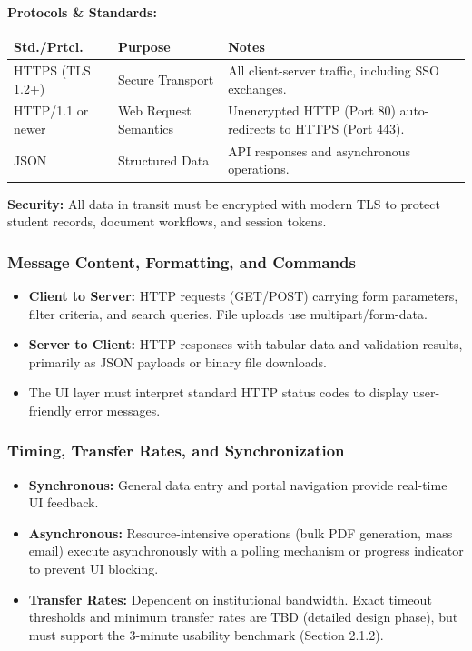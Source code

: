 \documentclass[11pt, a4paper]{article}
\begin{document}
\textbf{Protocols \& Standards:}
\begin{table}[H]
\begin{tabularx}{\textwidth}{>{\raggedright\arraybackslash}p{2.2cm} >{\raggedright\arraybackslash}p{2cm} >{\raggedright\arraybackslash}X}
\toprule
\textbf{Std./Prtcl.} & \textbf{Purpose} & \textbf{Notes} \\
\midrule
HTTPS (TLS 1.2+) & Secure Transport & All client-server traffic, including SSO exchanges. \\
\midrule
HTTP/1.1 or newer & Web Request Semantics & Unencrypted HTTP (Port 80) auto-redirects to HTTPS (Port 443). \\
\midrule
JSON & Structured Data & API responses and asynchronous operations. \\
\bottomrule
\end{tabularx}
\end{table}

\textbf{Security:}
All data in transit must be encrypted with modern TLS to protect student records, document workflows, and session tokens.

\subsubsection{Message Content, Formatting, and Commands}
\begin{itemize}
    \item \textbf{Client to Server:} HTTP requests (GET/POST) carrying form parameters, filter criteria, and search queries. File uploads use multipart/form-data.
    \item \textbf{Server to Client:} HTTP responses with tabular data and validation results, primarily as JSON payloads or binary file downloads.
    \item The UI layer must interpret standard HTTP status codes to display user-friendly error messages.
\end{itemize}

\subsubsection{Timing, Transfer Rates, and Synchronization}
\begin{itemize}
    \item \textbf{Synchronous:} General data entry and portal navigation provide real-time UI feedback.
    \item \textbf{Asynchronous:} Resource-intensive operations (bulk PDF generation, mass email) execute asynchronously with a polling mechanism or progress indicator to prevent UI blocking.
    \item \textbf{Transfer Rates:} Dependent on institutional bandwidth. Exact timeout thresholds and minimum transfer rates are TBD (detailed design phase), but must support the 3-minute usability benchmark (Section 2.1.2).
\end{itemize}
\end{document}
